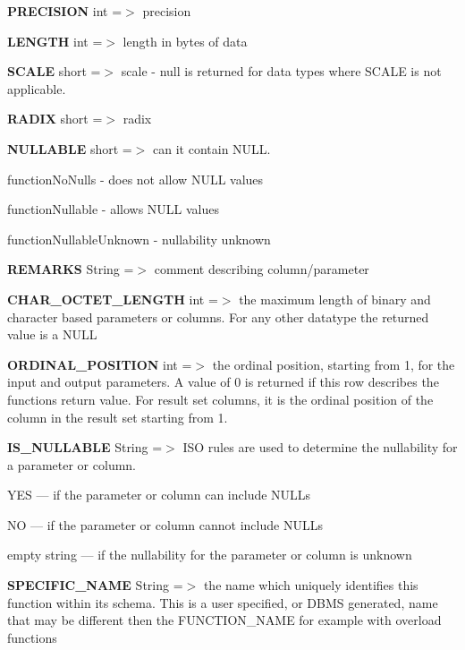 \begin{DoxyEnumerate}
\item {\bfseries P\+R\+E\+C\+I\+S\+I\+ON} int =$>$ precision 
\item {\bfseries L\+E\+N\+G\+TH} int =$>$ length in bytes of data 
\item {\bfseries S\+C\+A\+LE} short =$>$ scale -\/ null is returned for data types where S\+C\+A\+LE is not applicable. 
\item {\bfseries R\+A\+D\+IX} short =$>$ radix 
\item {\bfseries N\+U\+L\+L\+A\+B\+LE} short =$>$ can it contain N\+U\+LL. 
\begin{DoxyItemize}
\item function\+No\+Nulls -\/ does not allow N\+U\+LL values 
\item function\+Nullable -\/ allows N\+U\+LL values 
\item function\+Nullable\+Unknown -\/ nullability unknown 
\end{DoxyItemize}
\item {\bfseries R\+E\+M\+A\+R\+KS} String =$>$ comment describing column/parameter 
\item {\bfseries C\+H\+A\+R\+\_\+\+O\+C\+T\+E\+T\+\_\+\+L\+E\+N\+G\+TH} int =$>$ the maximum length of binary and character based parameters or columns. For any other datatype the returned value is a N\+U\+LL 
\item {\bfseries O\+R\+D\+I\+N\+A\+L\+\_\+\+P\+O\+S\+I\+T\+I\+ON} int =$>$ the ordinal position, starting from 1, for the input and output parameters. A value of 0 is returned if this row describes the function\textquotesingle{}s return value. For result set columns, it is the ordinal position of the column in the result set starting from 1. 
\item {\bfseries I\+S\+\_\+\+N\+U\+L\+L\+A\+B\+LE} String =$>$ I\+SO rules are used to determine the nullability for a parameter or column. 
\begin{DoxyItemize}
\item Y\+ES --- if the parameter or column can include N\+U\+L\+Ls 
\item NO --- if the parameter or column cannot include N\+U\+L\+Ls 
\item empty string --- if the nullability for the parameter or column is unknown 
\end{DoxyItemize}
\item {\bfseries S\+P\+E\+C\+I\+F\+I\+C\+\_\+\+N\+A\+ME} String =$>$ the name which uniquely identifies this function within its schema. This is a user specified, or D\+B\+MS generated, name that may be different then the {\ttfamily F\+U\+N\+C\+T\+I\+O\+N\+\_\+\+N\+A\+ME} for example with overload functions 
\end{DoxyEnumerate}

